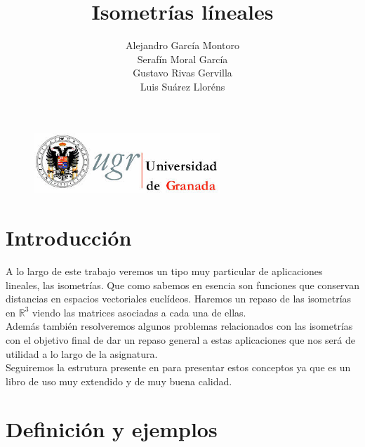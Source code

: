 \documentclass[10pt,a4paper]{article}
\author{Alejandro García Montoro \\ Serafín Moral García \\ Gustavo Rivas Gervilla \\ Luis Suárez Lloréns}
\title{Isometrías líneales}
\date{}
\theoremstyle{mystyle}
\newtheorem{defi}{\textcolor{red}{\textbf{Definición}}}
\begin{document}
\maketitle

\begin{figure}[H]
\centering
\includegraphics[width=70mm]{escudo.jpeg}
\end{figure}

\newpage

\tableofcontents

\newpage

\section{Introducción}

A lo largo de este trabajo veremos un tipo muy particular de aplicaciones lineales, las isometrías. Que como sabemos en esencia son funciones que conservan distancias en espacios vectoriales euclídeos. Haremos un repaso de las isometrías en $\mathbb{R}^3$ viendo las matrices asociadas a cada una de ellas.\\

Además también resolveremos algunos problemas relacionados con las isometrías con el objetivo final de dar un repaso general a estas aplicaciones que nos será de utilidad a lo largo de la asignatura.\\

Seguiremos la estrutura presente en \cite{merino} para presentar estos conceptos ya que es un libro de uso muy extendido y de muy buena calidad.

\section{Definición y ejemplos}

\hfill \\
\end{document}
